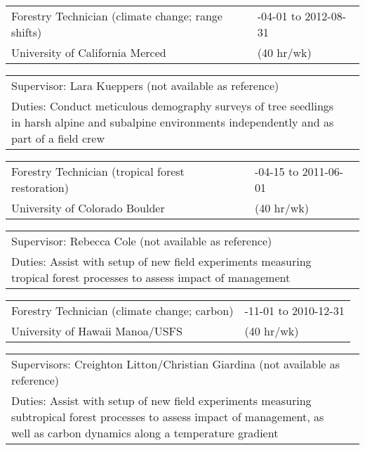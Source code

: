 \documentclass[10pt,english]{article}
\providecommand{\tabularnewline}{\\}
\begin{document}
\renewcommand{\arraystretch}{1.2}
\begin{tabularx}{\textwidth}{@{}>{\raggedright}p{4.5in} >{\raggedleft}X@{}}
Forestry Technician (climate change; range shifts) & 2012-04-01 to 2012-08-31 \tabularnewline
University of California Merced & (40 hr/wk) \tabularnewline
\end{tabularx}

\renewcommand{\arraystretch}{1.2}
\begin{tabularx}{\textwidth}{@{}>{\raggedright}p{6.25in} >{\raggedleft}X@{}}
\addtolength{\leftskip}{5ex}Supervisor: Lara Kueppers (not available as reference) \tabularnewline
\addtolength{\leftskip}{5ex}Duties: Conduct meticulous demography surveys of tree seedlings in harsh alpine and subalpine environments independently and as part of a field crew  \tabularnewline
\end{tabularx}

\renewcommand{\arraystretch}{1.2}
\begin{tabularx}{\textwidth}{@{}>{\raggedright}p{4.5in} >{\raggedleft}X@{}}
Forestry Technician (tropical forest restoration) & 2011-04-15 to 2011-06-01 \tabularnewline
University of Colorado Boulder & (40 hr/wk) \tabularnewline
\end{tabularx}

\renewcommand{\arraystretch}{1.2}
\begin{tabularx}{\textwidth}{@{}>{\raggedright}p{6.25in} >{\raggedleft}X@{}}
\addtolength{\leftskip}{5ex}Supervisor: Rebecca Cole (not available as reference) \tabularnewline
\addtolength{\leftskip}{5ex}Duties: Assist with setup of new field experiments measuring tropical forest processes to assess impact of management \tabularnewline
\end{tabularx}

\renewcommand{\arraystretch}{1.2}
\begin{tabularx}{\textwidth}{@{}>{\raggedright}p{4.5in} >{\raggedleft}X@{}}
Forestry Technician (climate change; carbon) & 2009-11-01 to 2010-12-31 \tabularnewline
University of Hawaii Manoa/USFS & (40 hr/wk) \tabularnewline
\end{tabularx}

\renewcommand{\arraystretch}{1.2}
\begin{tabularx}{\textwidth}{@{}>{\raggedright}p{6.25in} >{\raggedleft}X@{}}
\addtolength{\leftskip}{5ex}Supervisors: Creighton Litton/Christian Giardina (not available as reference) \tabularnewline
\addtolength{\leftskip}{5ex}Duties: Assist with setup of new field experiments measuring subtropical forest processes to assess impact of management, as well as carbon dynamics along a temperature gradient \tabularnewline
\end{tabularx}
\end{document}
